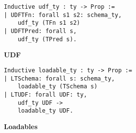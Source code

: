 \begin{figure}
\begin{lstlisting}
Inductive udf_ty : ty -> Prop := 
| UDFTFn: forall s1 s2: schema_ty,
    udf_ty (TFn s1 s2)
| UDFTPred: forall s,
    udf_ty (TPred s).
\end{lstlisting}
\caption{\textbf{UDF}}
\label{fig-udf}
\end{figure}

\begin{figure}
\begin{lstlisting}
Inductive loadable_ty : ty -> Prop :=
| LTSchema: forall s: schema_ty,
    loadable_ty (TSchema s)
| LTUDF: forall UDF: ty,
    udf_ty UDF ->
    loadable_ty UDF.
\end{lstlisting}
\caption{\textbf{Loadables}}
\label{fig-loadable}
\end{figure}



%


